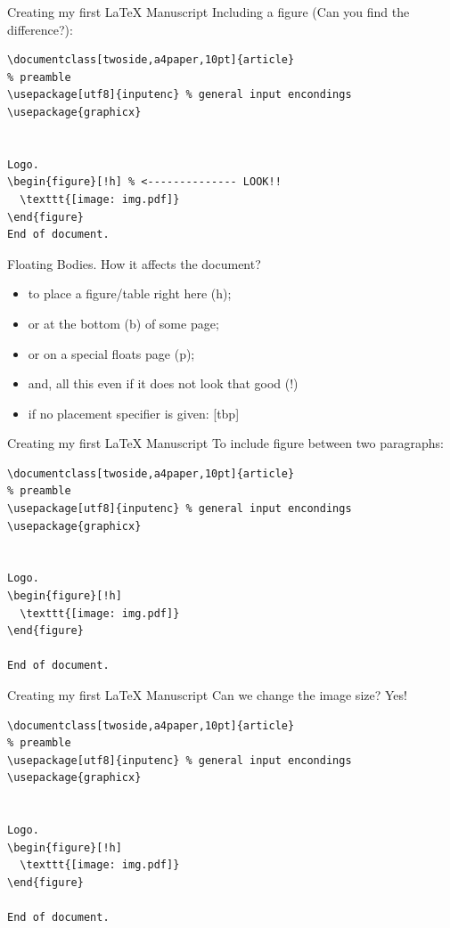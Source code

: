 \begin{frame}[fragile]{Creating my first \LaTeX{} Manuscript}
Including a figure (Can you find the difference?):
\footnotesize
\begin{verbatim}
\documentclass[twoside,a4paper,10pt]{article}
% preamble
\usepackage[utf8]{inputenc} % general input encondings
\usepackage{graphicx}


Logo.
\begin{figure}[!h] % <-------------- LOOK!!
  \texttt{[image: img.pdf]}
\end{figure}
End of document.

\end{verbatim}
\end{frame}


\begin{frame}{Floating Bodies.}
How it affects the document?
\begin{itemize}
\item to place a figure/table right here (h);
\item or at the bottom (b) of some page;
\item or on a special floats page (p);
\item and, all this even if it does not look that good (!)
\item if no placement specifier is given: [tbp]
\end{itemize}
\end{frame}

\begin{frame}[fragile]{Creating my first \LaTeX{} Manuscript}
To include figure between two paragraphs:
\footnotesize
\begin{verbatim}
\documentclass[twoside,a4paper,10pt]{article}
% preamble
\usepackage[utf8]{inputenc} % general input encondings
\usepackage{graphicx}


Logo.
\begin{figure}[!h] 
  \texttt{[image: img.pdf]}
\end{figure}

End of document.

\end{verbatim}
\end{frame}


\begin{frame}[fragile]{Creating my first \LaTeX{} Manuscript}
Can we change the image size? Yes!
\footnotesize
\begin{verbatim}
\documentclass[twoside,a4paper,10pt]{article}
% preamble
\usepackage[utf8]{inputenc} % general input encondings
\usepackage{graphicx}


Logo.
\begin{figure}[!h] 
  \texttt{[image: img.pdf]}
\end{figure}

End of document.

\end{verbatim}
\end{frame}

